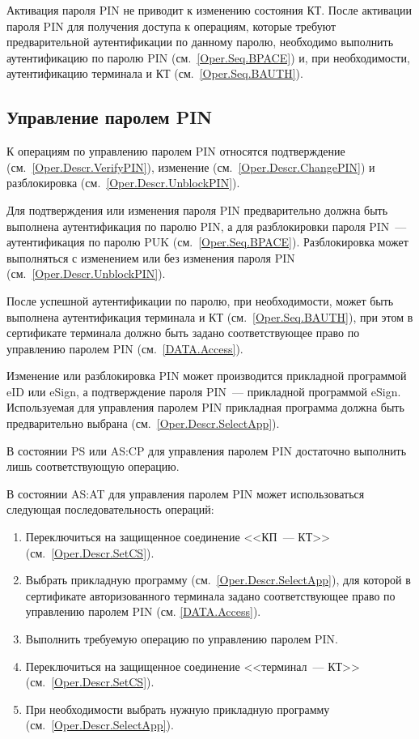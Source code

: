 Активация пароля PIN не приводит к изменению состояния КТ.
После активации пароля PIN для получения доступа к
операциям, которые требуют предварительной
аутентификации по данному паролю, необходимо выполнить аутентификацию 
по паролю PIN (см.~\ref{Oper.Seq.BPACE}) и, при необходимости, 
аутентификацию терминала и КТ (см.~\ref{Oper.Seq.BAUTH}).

\subsection{Управление паролем PIN}
\label{Oper.Seq.ControlPIN}

К операциям по управлению паролем PIN относятся
подтверждение (см.~\ref{Oper.Descr.VerifyPIN}),
изменение (см.~\ref{Oper.Descr.ChangePIN}) и
разблокировка (см.~\ref{Oper.Descr.UnblockPIN}).

Для подтверждения или изменения пароля PIN предварительно 
должна быть выполнена аутентификация по 
паролю PIN, а для разблокировки пароля PIN~---
аутентификация по паролю PUK (см.~\ref{Oper.Seq.BPACE}).
Разблокировка может выполняться с изменением или без 
изменения пароля PIN (см.~\ref{Oper.Descr.UnblockPIN}).

После успешной аутентификации по паролю,
при необходимости, может быть выполнена аутентификация 
терминала и КТ (см.~\ref{Oper.Seq.BAUTH}),
при этом в сертификате терминала должно быть задано соответствующее 
право по управлению паролем PIN (см.~\ref{DATA.Access}).

Изменение или разблокировка PIN может
производится прикладной программой eID или eSign,
а подтверждение пароля PIN~--- прикладной программой eSign.
Используемая для управления паролем PIN прикладная
программа должна быть предварительно 
выбрана (см.~\ref{Oper.Descr.SelectApp}). 

В состоянии PS или AS:CP для управления паролем PIN
достаточно выполнить лишь соответствующую операцию.

В состоянии AS:AT для управления паролем PIN может
использоваться следующая последовательность операций:
%
\begin{enumerate} 
\item Переключиться на защищенное соединение <<КП~--- КТ>> 
      (см.~\ref{Oper.Descr.SetCS}).
\item Выбрать прикладную программу (см.~\ref{Oper.Descr.SelectApp}),
      для которой в сертификате авторизованного терминала задано 
      соответствующее право по управлению паролем PIN (см. \ref{DATA.Access}).
\item Выполнить требуемую операцию по управлению паролем PIN.
\item Переключиться на защищенное соединение <<терминал~--- КТ>> 
      (см.~\ref{Oper.Descr.SetCS}).
\item При необходимости выбрать нужную прикладную программу 
      (см.~\ref{Oper.Descr.SelectApp}).
\end{enumerate}


